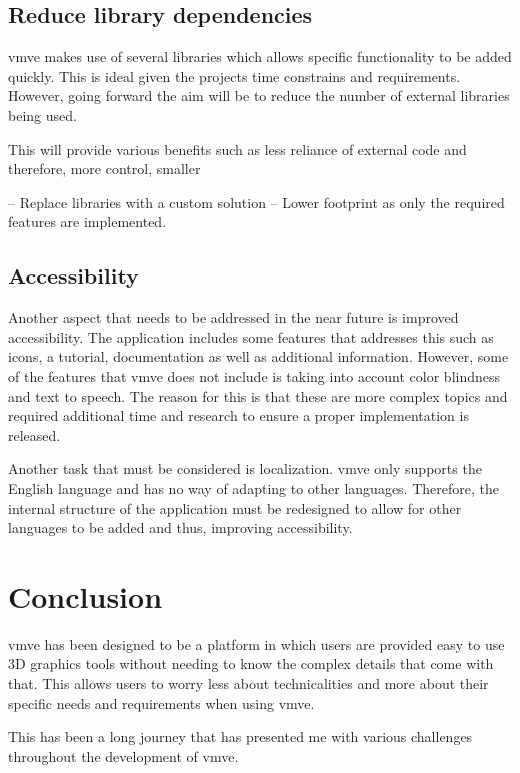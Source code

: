 \documentclass[11pt]{article}
\begin{document}
\subsection{Reduce library dependencies}
\gls{vmve} makes use of several libraries which allows specific functionality to be
added quickly. This is ideal given the projects time constrains and
requirements. However, going forward the aim will be to reduce the number of
external libraries being used.

This will provide various benefits such as less reliance of external code and
therefore, more control, smaller 


-- Replace libraries with a custom solution --
Lower footprint as only the required features are implemented.

\subsection{Accessibility}
Another aspect that needs to be addressed in the near future is improved
accessibility. The application includes some features that addresses this such
as icons, a tutorial, documentation as well as additional information. However,
some of the features that \gls{vmve} does not include is taking into account
color blindness and text to speech. The reason for this is that these are more
complex topics and required additional time and research to ensure a proper 
implementation is released.

Another task that must be considered is localization. \gls{vmve} only supports
the English language and has no way of adapting to other languages. Therefore,
the internal structure of the application must be redesigned to allow for
other languages to be added and thus, improving accessibility.

\section{Conclusion}

\gls{vmve} has been designed to be a platform in which users are provided easy to use
3D graphics tools without needing to know the complex details that come with
that. This allows users to worry less about technicalities and more about their
specific needs and requirements when using \gls{vmve}.

This has been a long journey that has presented me with various challenges
throughout the development of \gls{vmve}.


\clearpage
\printglossary
\end{document}
